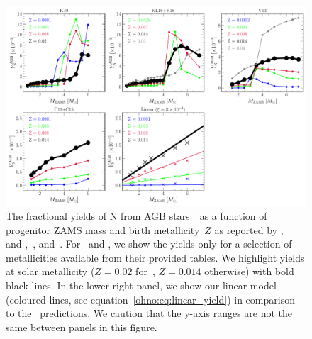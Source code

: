 \begin{figure}
\centering
\includegraphics[scale = 0.45]{agb_yield_models.pdf}
\caption{
The fractional yields of N from AGB stars~~as a function of progenitor
ZAMS mass and birth metallicity~$Z$ as reported by
\citet[][upper left]{Karakas2010},~\citet{Karakas2016} and
\citet[][upper middle]{Karakas2018},~\citet[][upper right]{Ventura2013,
Ventura2014, Ventura2018, Ventura2020}, and~\citet[][lower left]{Cristallo2011,
Cristallo2015}.
For~\citet{Ventura2013, Ventura2014, Ventura2018, Ventura2020} and
\citet{Cristallo2011, Cristallo2015}, we show the yields only for a selection
of metallicities available from their provided tables.
We highlight yields at solar metallicity ($Z = 0.02$ for~\citealp{Karakas2010},
$Z = 0.014$ otherwise) with bold black lines.
In the lower right panel, we show our linear model (coloured lines, see
equation~\ref{ohno:eq:linear_yield}) in comparison to
the~\citet[][coloured X's]{Cristallo2011, Cristallo2015} predictions.
We caution that the y-axis ranges are not the same between panels in this
figure.
}
\label{ohno:fig:agb_yield_models}
\end{figure}

